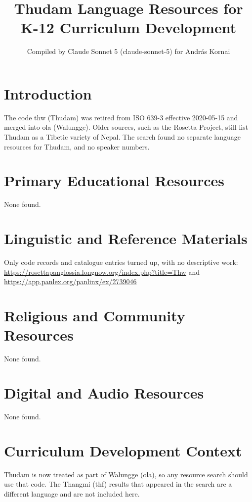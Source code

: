 \documentclass[12pt]{article}
\title{Thudam Language Resources for K-12 Curriculum Development}
\author{Compiled by Claude Sonnet 5 (claude-sonnet-5) for Andr\'as Kornai}
\date{}
\begin{document}
\maketitle

\section{Introduction}
The code thw (Thudam) was retired from ISO 639-3 effective 2020-05-15 and merged into ola (Walungge). Older sources, such as the Rosetta Project, still list Thudam as a Tibetic variety of Nepal. The search found no separate language resources for Thudam, and no speaker numbers.

\section{Primary Educational Resources}
None found.

\section{Linguistic and Reference Materials}
Only code records and catalogue entries turned up, with no descriptive work: \url{https://rosettapanglossia.longnow.org/index.php?title=Thw} and \url{https://app.panlex.org/panlinx/ex/2739046}

\section{Religious and Community Resources}
None found.

\section{Digital and Audio Resources}
None found.

\section{Curriculum Development Context}
Thudam is now treated as part of Walungge (ola), so any resource search should use that code. The Thangmi (thf) results that appeared in the search are a different language and are not included here.
\end{document}
